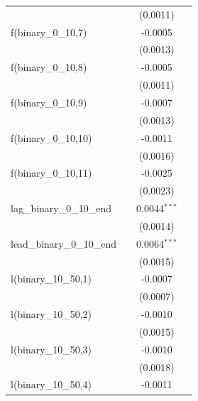 \begin{tabular}{lccc}
                                    &          & (0.0011)              &   \\   
   f(binary\_0\_10,7)               &          & -0.0005               &   \\   
                                    &          & (0.0013)              &   \\   
   f(binary\_0\_10,8)               &          & -0.0005               &   \\   
                                    &          & (0.0011)              &   \\   
   f(binary\_0\_10,9)               &          & -0.0007               &   \\   
                                    &          & (0.0013)              &   \\   
   f(binary\_0\_10,10)              &          & -0.0011               &   \\   
                                    &          & (0.0016)              &   \\   
   f(binary\_0\_10,11)              &          & -0.0025               &   \\   
                                    &          & (0.0023)              &   \\   
   lag\_binary\_0\_10\_end          &          & 0.0044$^{***}$        &   \\   
                                    &          & (0.0014)              &   \\   
   lead\_binary\_0\_10\_end         &          & 0.0064$^{***}$        &   \\   
                                    &          & (0.0015)              &   \\   
   l(binary\_10\_50,1)              &          & -0.0007               &   \\   
                                    &          & (0.0007)              &   \\   
   l(binary\_10\_50,2)              &          & -0.0010               &   \\   
                                    &          & (0.0015)              &   \\   
   l(binary\_10\_50,3)              &          & -0.0010               &   \\   
                                    &          & (0.0018)              &   \\   
   l(binary\_10\_50,4)              &          & -0.0011               &   \\   

\end{tabular}
